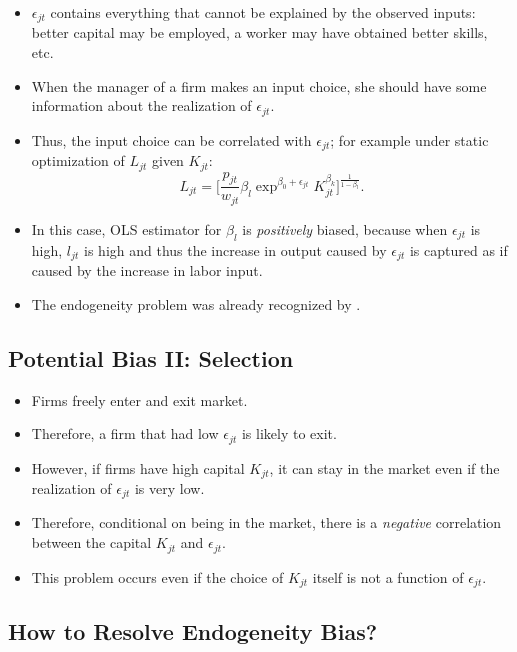 \documentclass[
]{book}
\providecommand{\tightlist}{%
  \setlength{\itemsep}{0pt}\setlength{\parskip}{0pt}}
\begin{document}
\begin{itemize}
\tightlist
\item
  \(\epsilon_{jt}\) contains everything that cannot be explained by the observed inputs: better capital may be employed, a worker may have obtained better skills, etc.
\item
  When the manager of a firm makes an input choice, she should have some information about the realization of \(\epsilon_{jt}\).
\item
  Thus, the input choice can be correlated with \(\epsilon_{jt}\); for example under static optimization of \(L_{jt}\) given \(K_{jt}\):
  \begin{equation}
  L_{jt} = \Bigg[\frac{p_{jt}}{w_{jt}} \beta_l \exp^{\beta_0 + \epsilon_{jt}} K_{jt}^{\beta_k}\Bigg]^{\frac{1}{1 - \beta_l}}.
  \end{equation}
\item
  In this case, OLS estimator for \(\beta_l\) is \textit{positively} biased, because when \(\epsilon_{jt}\) is high, \(l_{jt}\) is high and thus the increase in output caused by \(\epsilon_{jt}\) is captured as if caused by the increase in labor input.
\item
  The endogeneity problem was already recognized by \citet{Marschak1944}.
\end{itemize}

\hypertarget{potential-bias-ii-selection}{%
\subsection{Potential Bias II: Selection}\label{potential-bias-ii-selection}}

\begin{itemize}
\tightlist
\item
  Firms freely enter and exit market.
\item
  Therefore, a firm that had low \(\epsilon_{jt}\) is likely to exit.
\item
  However, if firms have high capital \(K_{jt}\), it can stay in the market even if the realization of \(\epsilon_{jt}\) is very low.
\item
  Therefore, conditional on being in the market, there is a \textit{negative} correlation between the capital \(K_{jt}\) and \(\epsilon_{jt}\).
\item
  This problem occurs even if the choice of \(K_{jt}\) itself is not a function of \(\epsilon_{jt}\).
\end{itemize}

\hypertarget{how-to-resolve-endogeneity-bias}{%
\subsection{How to Resolve Endogeneity Bias?}\label{how-to-resolve-endogeneity-bias}}
\end{document}
